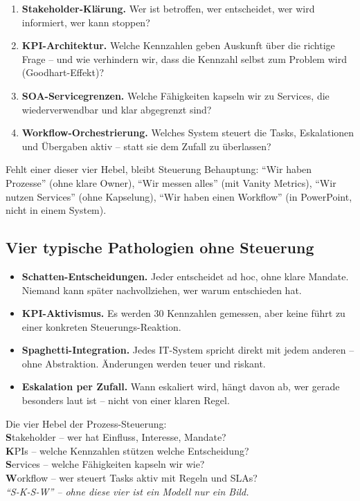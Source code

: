 \documentclass[11pt,a4paper,oneside]{article}
\newcommand{\caveatfontfallback}{\itshape}
\newcommand\caveatfont{\caveatfontfallback}%
\newcommand{\akzent}[1]{{\caveatfont\color{lpAmber}#1}}
\newcommand{\fachbegriff}[1]{\textbf{#1}}
\begin{document}
\begin{enumerate}
  \item \fachbegriff{Stakeholder-Klärung.} Wer ist betroffen, wer entscheidet, wer wird informiert, wer kann stoppen?
  \item \fachbegriff{KPI-Architektur.} Welche Kennzahlen geben Auskunft über die richtige Frage -- und wie verhindern wir, dass die Kennzahl selbst zum Problem wird (Goodhart-Effekt)?
  \item \fachbegriff{SOA-Servicegrenzen.} Welche Fähigkeiten kapseln wir zu Services, die wiederverwendbar und klar abgegrenzt sind?
  \item \fachbegriff{Workflow-Orchestrierung.} Welches System steuert die Tasks, Eskalationen und Übergaben aktiv -- statt sie dem Zufall zu überlassen?
\end{enumerate}

Fehlt einer dieser vier Hebel, bleibt Steuerung Behauptung: ``Wir haben Prozesse'' (ohne klare Owner), ``Wir messen alles'' (mit Vanity Metrics), ``Wir nutzen Services'' (ohne Kapselung), ``Wir haben einen Workflow'' (in PowerPoint, nicht in einem System).

\subsection{Vier typische Pathologien ohne Steuerung}

\begin{itemize}
  \item \fachbegriff{Schatten-Entscheidungen.} Jeder entscheidet ad hoc, ohne klare Mandate. Niemand kann später nachvollziehen, wer warum entschieden hat.
  \item \fachbegriff{KPI-Aktivismus.} Es werden 30 Kennzahlen gemessen, aber keine führt zu einer konkreten Steuerungs-Reaktion.
  \item \fachbegriff{Spaghetti-Integration.} Jedes IT-System spricht direkt mit jedem anderen -- ohne Abstraktion. Änderungen werden teuer und riskant.
  \item \fachbegriff{Eskalation per Zufall.} Wann eskaliert wird, hängt davon ab, wer gerade besonders laut ist -- nicht von einer klaren Regel.
\end{itemize}

\begin{eselsbox}[Eselsbrücke: \akzent{S-K-S-W}]
Die vier Hebel der Prozess-Steuerung:\\[2pt]
\textbf{S}takeholder -- wer hat Einfluss, Interesse, Mandate?\\
\textbf{K}PIs -- welche Kennzahlen stützen welche Entscheidung?\\
\textbf{S}ervices -- welche Fähigkeiten kapseln wir wie?\\
\textbf{W}orkflow -- wer steuert Tasks aktiv mit Regeln und SLAs?\\[2pt]
\emph{``S-K-S-W'' -- ohne diese vier ist ein Modell nur ein Bild.}
\end{eselsbox}
\end{document}
